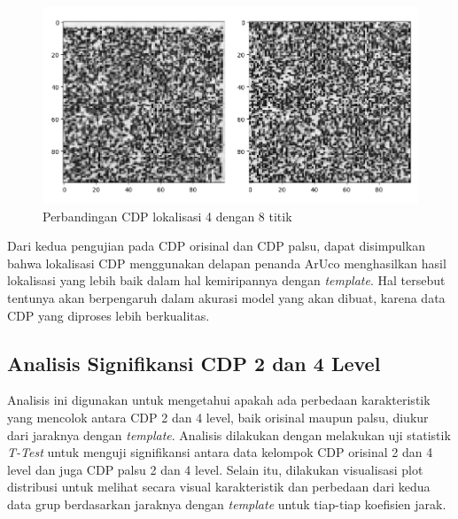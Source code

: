 \begin{figure}[h]
	\centering
	\includegraphics[width=12cm]{contents/chapter-4/4-cdplokalisasi8vs4.png}
	\caption{Perbandingan CDP lokalisasi 4 dengan 8 titik}
	\label{Fig: 4-cdplokalisasi8vs4}
\end{figure}

Dari kedua pengujian pada CDP orisinal dan CDP palsu, dapat disimpulkan bahwa lokalisasi CDP menggunakan delapan penanda ArUco menghasilkan hasil lokalisasi
yang lebih baik dalam hal kemiripannya dengan \emph{template}. Hal tersebut tentunya akan berpengaruh dalam akurasi model yang akan dibuat, karena data CDP
yang diproses lebih berkualitas.

\subsection{Analisis Signifikansi CDP 2 dan 4 Level}
Analisis ini digunakan untuk mengetahui apakah ada perbedaan karakteristik yang mencolok antara CDP 2 dan 4 level, baik orisinal maupun palsu, diukur dari
jaraknya dengan \emph{template}. Analisis dilakukan dengan melakukan uji statistik \emph{T-Test} untuk menguji signifikansi antara data kelompok CDP orisinal 2
dan 4 level dan juga CDP palsu 2 dan 4 level. Selain itu, dilakukan visualisasi plot distribusi untuk melihat secara visual karakteristik dan perbedaan dari
kedua data grup berdasarkan jaraknya dengan \emph{template} untuk tiap-tiap koefisien jarak.

